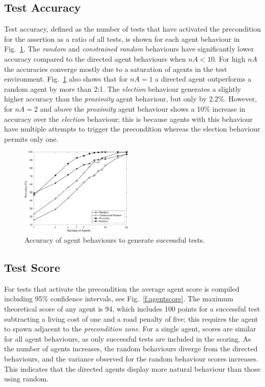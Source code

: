 \documentclass[letterpaper, 10 pt, journal, twoside]{IEEEtran}
\begin{document}
\subsection{Test Accuracy}
Test accuracy, defined as the number of tests that have activated the precondition for the assertion as a ratio of all tests, is shown for each agent behaviour in Fig.~\ref{f:accuracy}. The \textit{random} and \textit{constrained random} behaviours have significantly lower accuracy compared to the directed agent behaviours when $nA<10$. For high $nA$ the accuracies converge mostly due to a saturation of agents in the test environment.
%
Fig.~\ref{f:accuracy} also shows that for $nA=1$ a directed agent outperforms a random agent by more than 2:1. The \textit{election} behaviour generates a slightly higher accuracy than the \textit{proximity} agent behaviour, but only by 2.2\%. However, for $nA=2$ and above the \textit{proximity} agent behaviour shows a 10\% increase in accuracy over the \textit{election} behaviour; this is because agents with this behaviour have multiple attempts to trigger the precondition whereas the election behaviour permits only one. 


\begin{figure}[!t]
	\centering
\includegraphics[width=0.48\textwidth]{Accuracy.pdf}
	\caption{Accuracy of agent behaviours to generate successful tests.}
	\label{f:accuracy}
\end{figure}


\subsection{Test Score} \label{s:testscore}

For tests that activate the precondition the average agent score is compiled including 95\% confidence intervals, see Fig.~\ref{f:agentscore}. The maximum theoretical score of any agent is 94, which includes 100 points for a successful test subtracting a living cost of one and a road penalty of five; this requires the agent to spawn adjacent to the \textit{precondition zone}. 
%
For a single agent, scores are similar for all agent behaviours, as only successful tests are included in the scoring. As the number of agents increases, the random behaviours diverge from the directed behaviours, and the variance observed for the random behaviour scores increases. This indicates that the directed agents display more natural behaviour than those using random.
\end{document}
